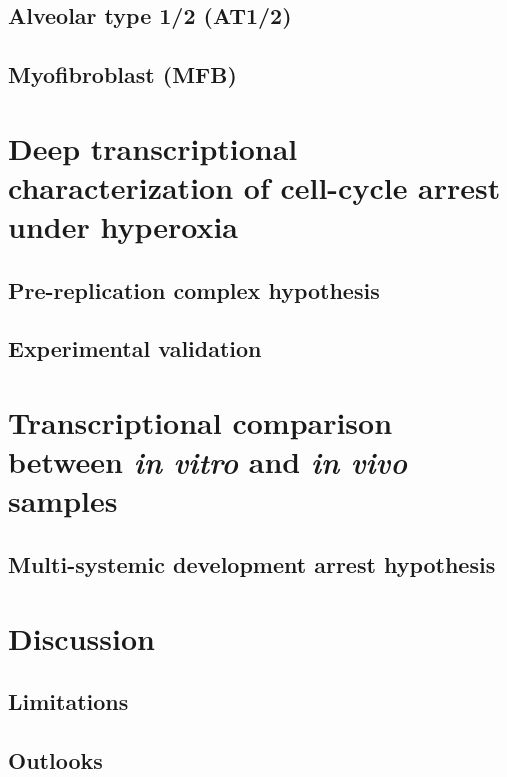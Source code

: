     \subsection{Alveolar type 1/2 (AT1/2)}
    \subsection{Myofibroblast (MFB)}

\section{Deep transcriptional characterization of cell-cycle arrest under hyperoxia}
    \subsection{Pre-replication complex hypothesis}
    \subsection{Experimental validation}

\section{Transcriptional comparison between \textit{in vitro} and \textit{in vivo} samples}
    \subsection{Multi-systemic development arrest hypothesis}

\section{Discussion}
    \subsection{Limitations}
    \subsection{Outlooks}